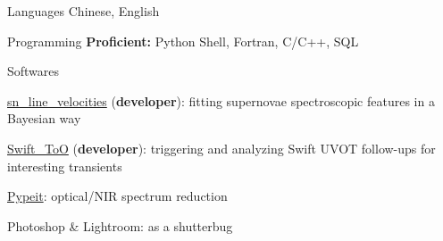 


\begin{cvskills}


\cvskill
{Languages} %
{Chinese, English} %


\cvskill
{Programming} %
{{\bf\color{darktext}Proficient:} Python Shell, Fortran, C/C++, SQL} %



\cvskill
{Softwares} %
{\begin{cvitems}
    \item {\href{https://github.com/slowdivePTG/sn_line_velocities}{sn\_line\_velocities} ({\bf\color{darktext}developer}): fitting supernovae spectroscopic features in a Bayesian way}
    \item {\href{https://github.com/slowdivePTG/Swift_ToO}{Swift\_ToO} ({\bf\color{darktext}developer}): triggering and analyzing Swift UVOT follow-ups for interesting transients}
    \item \href{https://pypeit.readthedocs.io/en/release/}{Pypeit}: optical/NIR spectrum reduction
    \item Photoshop \& Lightroom: as a shutterbug
\end{cvitems}}%

\end{cvskills}